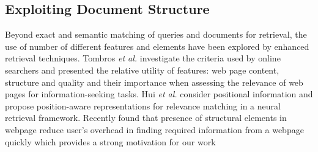 \subsection{Exploiting Document Structure}
Beyond exact and semantic matching of queries and documents for retrieval, the 
use of number of different features and elements have been explored by enhanced 
retrieval techniques. Tombros \textit{et al.} \cite{tombros2005users} 
investigate the criteria used by online searchers  and presented the relative 
utility of features: web page content,
structure and quality and their importance when assessing the relevance of web 
pages for information-seeking tasks. Hui \textit{et al.}\cite{hui2017position} 
consider positional information and propose position-aware representations for 
relevance matching in a neural retrieval framework. Recently  \cite{verma2016obtaining} 
found that presence of structural elements in webpage reduce user's overhead in finding 
required information from a webpage quickly which provides a strong motivation for our work 


